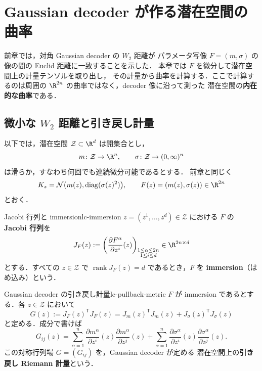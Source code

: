 \chapter{Gaussian decoder が作る潜在空間の曲率}
\label{ch:latent-curvature}

前章では，対角 Gaussian decoder の $W_2$ 距離が
パラメータ写像 $F=(m,\sigma)$ の像の間の Euclid 距離に一致することを示した．
本章では $F$ を微分して潜在空間上の計量テンソルを取り出し，
その計量から曲率を計算する．ここで計算するのは周囲の
$\R^{2n}$ の曲率ではなく，decoder 像に沿って測った
潜在空間の\textbf{内在的な曲率}である．

\section{微小な \texorpdfstring{$W_2$}{W2} 距離と引き戻し計量}
\label{sec:lc-pullback-metric}

以下では，潜在空間 $\mathcal{Z}\subset\R^d$ は開集合とし，
\[
  m\colon\mathcal{Z}\to\R^n,
  \qquad
  \sigma\colon\mathcal{Z}\to(0,\infty)^n
\]
は滑らか，すなわち何回でも連続微分可能であるとする．
前章と同じく
\[
  K_z=\mathcal{N}\bigl(m(z),\operatorname{diag}(\sigma(z)^2)\bigr),
  \qquad
  F(z)=(m(z),\sigma(z))\in\R^{2n}
\]
とおく．

\begin{definition}{Jacobi 行列と immersion}{lc-immersion}
  $z=(z^1,\dots,z^d)\in\mathcal{Z}$ における $F$ の
  \textbf{Jacobi 行列}を
  \[
    J_F(z)
    :=\left(\frac{\partial F^\alpha}{\partial z^i}(z)\right)_
      {\substack{1\leq\alpha\leq2n\\1\leq i\leq d}}
    \in\R^{2n\times d}
  \]
  とする．すべての $z\in\mathcal{Z}$ で
  $\operatorname{rank}J_F(z)=d$ であるとき，$F$ を
  \textbf{immersion}（はめ込み）という．
\end{definition}

\begin{definition}{Gaussian decoder の引き戻し計量}{lc-pullback-metric}
  $F$ が immersion であるとする．各 $z\in\mathcal{Z}$ において
  \[
    \boxed{
      G(z):=J_F(z)^{\mathsf T}J_F(z)
      =J_m(z)^{\mathsf T}J_m(z)
       +J_\sigma(z)^{\mathsf T}J_\sigma(z)
    }
  \]
  と定める．成分で書けば
  \[
    G_{ij}(z)
    =\sum_{\alpha=1}^n
       \frac{\partial m^\alpha}{\partial z^i}(z)
       \frac{\partial m^\alpha}{\partial z^j}(z)
     +\sum_{\alpha=1}^n
       \frac{\partial \sigma^\alpha}{\partial z^i}(z)
       \frac{\partial \sigma^\alpha}{\partial z^j}(z).
  \]
  この対称行列場 $G=(G_{ij})$ を，Gaussian decoder が定める
  潜在空間上の\textbf{引き戻し Riemann 計量}という．
\end{definition}

